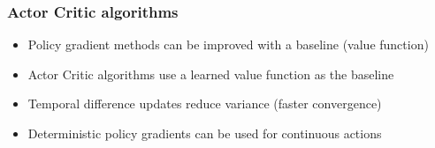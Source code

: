 \documentclass[11pt,table]{beamer}
\begin{document}
\begin{frame}



\frametitle{Actor Critic algorithms}

\begin{itemize}
    \item Policy gradient methods can be improved with a baseline (value function)
    \item Actor Critic algorithms use a learned value function as the baseline
    \item Temporal difference updates reduce variance (faster convergence)
    \item Deterministic policy gradients can be used for continuous actions
\end{itemize}

\end{frame}
\end{document}
